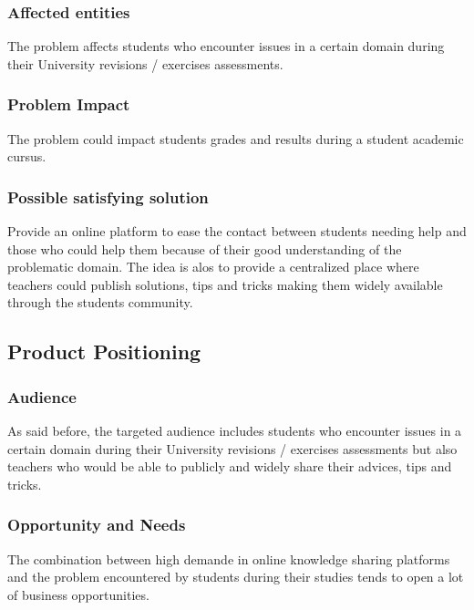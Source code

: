 \documentclass[12pt,a4paper,oneside, titlepage]{article}
\begin{document}
         \subsubsection{Affected entities}
         The problem affects students who encounter issues in a certain domain during their University 
         revisions / exercises assessments.
            
         \subsubsection{Problem Impact}
         The problem could impact students grades and results during a student academic cursus. 
                  
         \subsubsection{Possible satisfying solution}
         Provide an online platform to ease the contact between students needing help and those who could help 
         them because of their good understanding of the problematic domain. The idea is alos to provide a 
         centralized place where teachers could publish solutions, tips and tricks making them widely available 
         through the students community.
         
         
		\subsection{Product Positioning}
		
		\subsubsection{Audience}
		As said before, the targeted audience includes students who encounter issues in a certain domain during 
		their University revisions / exercises assessments but also teachers who would be able to publicly and 
		widely share their advices, tips and tricks.
		
	    \subsubsection{Opportunity and Needs}
		The combination between high demande in online knowledge sharing platforms and the problem encountered 
		by students during their studies tends to open a lot of business opportunities.
		
\end{document}
